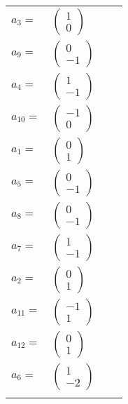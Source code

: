 \documentclass[1p]{elsarticle_modified}
\theoremstyle{definition}
\begin{document}
\begin{tabular}{m{7pt} m{180pt} m{7pt} m{180pt} }
\flushright $a_{3}=$&$\begin{pmatrix}1\\0\end{pmatrix}$ \\
\flushright $a_{9}=$&$\begin{pmatrix}0\\-1\end{pmatrix}$ \\
\flushright $a_{4}=$&$\begin{pmatrix}1\\-1\end{pmatrix}$ \\
\flushright $a_{10}=$&$\begin{pmatrix}-1\\0\end{pmatrix}$ \\
\flushright $a_{1}=$&$\begin{pmatrix}0\\1\end{pmatrix}$ \\
\flushright $a_{5}=$&$\begin{pmatrix}0\\-1\end{pmatrix}$ \\
\flushright $a_{8}=$&$\begin{pmatrix}0\\-1\end{pmatrix}$ \\
\flushright $a_{7}=$&$\begin{pmatrix}1\\-1\end{pmatrix}$ \\
\flushright $a_{2}=$&$\begin{pmatrix}0\\1\end{pmatrix}$ \\
\flushright $a_{11}=$&$\begin{pmatrix}-1\\1\end{pmatrix}$ \\
\flushright $a_{12}=$&$\begin{pmatrix}0\\1\end{pmatrix}$ \\
\flushright $a_{6}=$&$\begin{pmatrix}1\\-2\end{pmatrix}$\\&\end{tabular}
\end{document}
